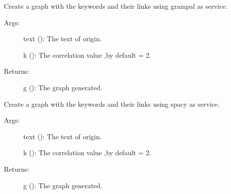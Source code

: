 \documentclass[letterpaper,10pt,english]{sphinxmanual}
\begin{document}

\begin{fulllineitems}
\label{\detokenize{keywords:keywords.create_graph_grampal}}
Create a graph with the keywords and their links using grampal as service.
\begin{description}
\item[{Args:}] \leavevmode
text (): The text of origin.

k (): The correlation value ,by default = 2.

\item[{Returns:}] \leavevmode
g (): The graph generated.

\end{description}

\end{fulllineitems}


\begin{fulllineitems}
\label{\detokenize{keywords:keywords.create_graph_spacy}}
Create a graph with the keywords and their links using spacy as service.
\begin{description}
\item[{Args:}] \leavevmode
text (): The text of origin.

k (): The correlation value ,by default = 2.

\item[{Returns:}] \leavevmode
g (): The graph generated.

\end{description}

\end{fulllineitems}

\end{document}
